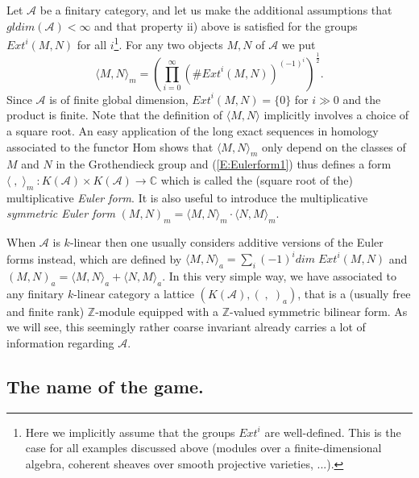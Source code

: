 \documentclass[a4paper,10pt]{amsart}
\def\Z{\mathbb{Z}}
\numberwithin{equation}{section}
\begin{document}
Let $\mathcal{A}$ be a finitary category, and let us make the additional assumptions that ${gldim}(\mathcal{A})<\infty$ and that property ii) above is satisfied for the groups $Ext^i(M,N)$ for all $i$\footnote{Here we implicitly assume that the groups $Ext^i$ are well-defined. This is the case for all examples discussed above (modules over a finite-dimensional algebra, coherent sheaves over smooth projective varieties, ...).}. For any two objects $M,N$ of $\mathcal{A}$ we put
\begin{equation}\label{E:Eulerform1}
\langle M, N \rangle_m=\left(\prod_{i=0}^\infty (\# {Ext}^i(M,N))^{(-1)^i}\right)^{\frac{1}{2}}.
\end{equation}
Since $\mathcal{A}$ is of finite global dimension, ${Ext}^i(M,N)=\{0\}$ for $i \gg 0$ and the product is finite.
Note that the definition of $\langle M,N\rangle$ implicitly involves a choice of a square root.
An easy application of the long exact sequences in homology associated to the functor $\text{Hom}$ shows that $\langle M, N \rangle_m$ only depend on the classes of $M$ and $N$ in the Grothendieck group and (\ref{E:Eulerform1}) thus defines a form $\langle\;,\; \rangle_m~:K(\mathcal{A}) \times K(\mathcal{A}) \to \mathbb{C}$ which is called the (square root of the) multiplicative \textit{Euler form}. It is also useful to introduce the multiplicative \textit{symmetric Euler form} $(M,N)_m=\langle M,N \rangle_m \cdot \langle N,M\rangle_m$.

\vspace{.1in}

When $\mathcal{A}$ is $k$-linear then one usually considers additive versions of the Euler forms instead, which are defined by $\langle M,N \rangle_{a}=\sum_i (-1)^i {dim}\;{Ext}^i(M,N)$ and $(M,N)_{a}=\langle M,N\rangle_{a} + \langle N,M \rangle_a$. In this very simple way, we have associated to any finitary $k$-linear category a lattice $(K(\mathcal{A}), (\;,\;)_a)$, that is a
(usually free and finite rank) $\Z$-module equipped with a $\Z$-valued symmetric bilinear form. As we will see, this seemingly rather coarse invariant already carries a lot of information regarding $\mathcal{A}$.

\vspace{.2in}

\subsection{The name of the game.}

\vspace{.15in}
\end{document}
